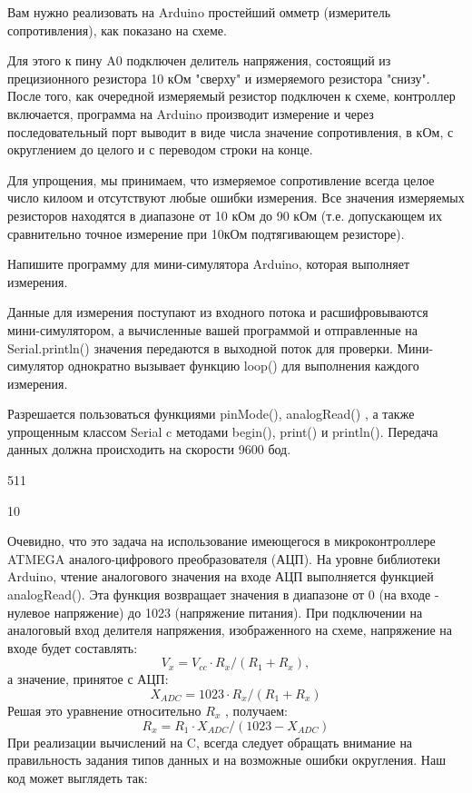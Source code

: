 
Вам нужно реализовать на Arduino простейший омметр (измеритель сопротивления), как показано на схеме. 


Для этого к пину A0 подключен делитель напряжения, состоящий из прецизионного резистора 10 кОм "сверху" и измеряемого резистора "снизу".  После того, как очередной измеряемый резистор подключен к схеме, контроллер включается, программа на Arduino производит измерение и через последовательный порт выводит в виде числа значение сопротивления, в кОм, с округлением до целого и с переводом строки на конце.   

Для упрощения,  мы принимаем, что измеряемое сопротивление всегда целое число килоом и отсутствуют любые ошибки измерения. Все значения измеряемых резисторов находятся в диапазоне от 10 кОм до 90 кОм (т.е. допускающем их сравнительно точное измерение при 10кОм подтягивающем резисторе).


Напишите программу для мини-симулятора Arduino, которая выполняет измерения.

Данные для измерения поступают из входного потока и расшифровываются мини-симулятором, а вычисленные вашей программой и отправленные на Serial.println() значения передаются в выходной поток для проверки.  Мини-симулятор однократно вызывает функцию loop() для выполнения каждого измерения. 

Разрешается пользоваться функциями pinMode(), analogRead() ,  а также упрощенным классом Serial c методами begin(), print() и println().  Передача данных должна происходить на скорости 9600 бод.

\begin{myverbbox}[\small]{\vinput}
    511
\end{myverbbox}
\begin{myverbbox}[\small]{\voutput}
    10
\end{myverbbox}

\solutionSection

Очевидно, что это задача на использование имеющегося в микроконтроллере ATMEGA аналого-цифрового преобразователя (АЦП).  На уровне библиотеки Arduino, чтение аналогового значения на входе АЦП выполняется функцией analogRead().  Эта функция возвращает значения в диапазоне от 0 (на входе - нулевое напряжение) до 1023 (напряжение питания).  При подключении на аналоговый вход делителя напряжения, изображенного на схеме,  напряжение на входе будет составлять:
$$V_x = V_{cc} \cdot R_x / (R_1 + R_x),$$ а значение, принятое с АЦП: $$X_{ADC} =  1023 \cdot  R_x / (R_1 + R_x)$$
Решая это уравнение относительно $R_x$ , получаем:  
$$R_x = R_1  \cdot X_{ADC} / (1023  - X_{ADC})$$ 
При реализации вычислений на C, всегда следует обращать внимание на правильность задания типов данных и на возможные ошибки округления.  Наш код может выглядеть так:

